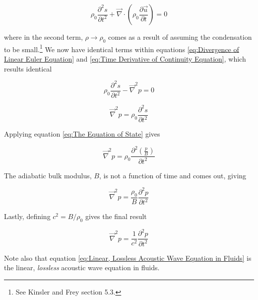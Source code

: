 \begin{equation} \label{eq:Time Derivative of Continuity Equation}
    \rho_0 \frac{\partial^2 s}{\partial t^2} + \vec{\nabla} \cdot \left(\rho_0 \frac{\partial \vec{u}}{\partial t}\right) = 0
\end{equation}

where in the second term, $\rho \rightarrow \rho_0$ comes as a result of assuming the condensation to be small.\footnote{See Kinsler and Frey section 5.3.} We now have identical terms within equations \ref{eq:Divergence of Linear Euler Equation} and \ref{eq:Time Derivative of Continuity Equation}, which results identical

\begin{equation}
    \rho_0 \frac{\partial^2 s}{\partial t^2} -\vec{\nabla}^2 p = 0
\end{equation}

\begin{equation}
    \vec{\nabla}^2 p = \rho_0 \frac{\partial^2 s}{\partial t^2}
\end{equation}

Applying equation \ref{eq:The Equation of State} gives

\begin{equation}
    \vec{\nabla}^2 p = \rho_0 \frac{\partial^2 \left(\frac{p}{B}\right)}{\partial t^2}
\end{equation}

The adiabatic bulk modulus, $B$, is not a function of time and comes out, giving

\begin{equation}
    \vec{\nabla}^2 p = \frac{\rho_0}{B} \frac{\partial^2 p}{\partial t^2}
\end{equation}

Lastly, defining $c^2 = B/\rho_0$ gives the final result

\begin{equation} \label{eq:Linear, Lossless Acoustic Wave Equation in Fluids}
    \boxed{\vec{\nabla}^2 p = \frac{1}{c^2} \frac{\partial^2 p}{\partial t^2}}
\end{equation}

Note also that equation \ref{eq:Linear, Lossless Acoustic Wave Equation in Fluids} is the linear, \textit{lossless} acoustic wave equation in fluids.